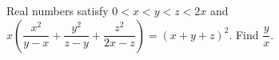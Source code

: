 Real numbers satisfy $0<x<y<z<2x$ and $x\left(\dfrac{x^2}{y-x}+\dfrac{y^2}{z-y}+\dfrac{z^2}{2x-z}\right)=(x+y+z)^2$. Find $\dfrac{y}{x}$.
